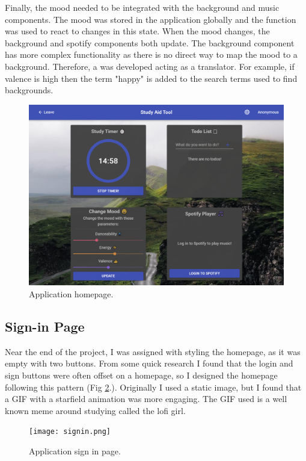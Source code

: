 \documentclass[conference]{IEEEtran}
\begin{document}
Finally, the mood needed to be integrated with the background and music components. The mood was stored in the application globally and the  function was used to react to changes in this state. When the mood changes, the background and spotify components both update. The background component has more complex functionality as there is no direct way to map the mood to a background. Therefore, a  was developed acting as a translator. For example, if valence is high then the term "happy" is added to the search terms used to find backgrounds.

\begin{figure}[htbp]
\centerline{\includegraphics[width = \linewidth]{homepage.png}}
\caption{Application homepage.}
\label{homepage}
\end{figure}

\subsection{Sign-in Page}
Near the end of the project, I was assigned with styling the homepage, as it was empty with two buttons. From some quick research I found that the login and sign buttons were often offset on a homepage, so I designed the homepage following this pattern (Fig \ref{signin}.). Originally I used a static image, but I found that a GIF with a starfield animation was more engaging. The GIF used is a well known meme around studying called the lofi girl.

\begin{figure}[htbp]
\centerline{\texttt{[image: signin.png]}}
\caption{Application sign in page.}
\label{signin}
\end{figure}
\end{document}
